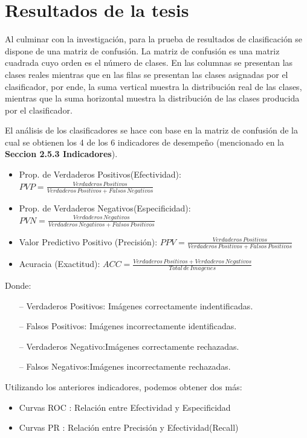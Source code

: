 \chapter{Resultados de la tesis}
\setcounter{page}{127}
\renewcommand{\baselinestretch}{1.2} %
	
	Al culminar con la investigación, para la prueba de resultados de clasificación se dispone de una matriz de confusión. La matriz de confusión es una matriz cuadrada cuyo orden es el número de clases. En las  columnas se presentan las clases reales mientras que en las filas se presentan las clases asignadas por el clasificador, por ende, la suma vertical muestra la distribución real de las clases, mientras que la suma horizontal muestra la distribución de las clases producida por el clasificador.

	El análisis de los clasificadores se hace con base en la matriz de confusión de la cual se obtienen los 4 de los 6 indicadores de desempeño (mencionado en la \textbf{Seccion 2.5.3 Indicadores}).

	\begin{itemize}

	\item Prop. de Verdaderos Positivos(Efectividad): {$PVP= \frac{Verdaderos\,Positivos}{{Verdaderos\,Positivos} + {Falsos\,Negativos}}$}
	\item Prop. de Verdaderos Negativos(Especificidad): {$PVN= \frac{Verdaderos\,Negativos}{{Verdaderos\,Negativos} + {Falsos\,Positivos}}$}
	\item Valor Predictivo Positivo (Precisión): {$PPV = \frac{Verdaderos\,Positivos}{{Verdaderos\,Positivos}+{Falsos\,Positivos}}$}
	\item Acuracia (Exactitud): {$ACC= \frac{Verdaderos\,Positivos+Verdaderos\,Negativos}{Total\,de\,Imagenes}$}
	\end{itemize}	
	Donde:
	\begin{itemize}
		\item[--] Verdaderos Positivos: Imágenes correctamente indentificadas.
		\item[--] Falsos Positivos: Imágenes incorrectamente identificadas.
		\item[--] Verdaderos Negativo:Imágenes correctamente rechazadas.
		\item[--] Falsos Negativos:Imágenes incorrectamente rechazadas.
	\end{itemize}
	
	Utilizando los anteriores indicadores, podemos obtener dos más:
	\begin{itemize}
		\item Curvas ROC : Relación entre Efectividad y Especificidad
		\item Curvas PR  : Relación entre Precisión y Efectividad(Recall)
	\end{itemize}

